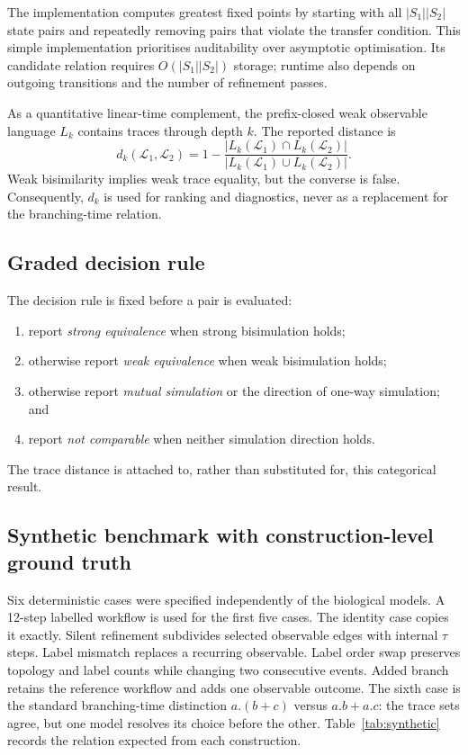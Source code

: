 \documentclass[pdflatex,sn-mathphys-ay]{sn-jnl}
\theoremstyle{definition}
\newcommand{\TAU}{\tau}
\begin{document}
The implementation computes greatest fixed points by starting with all
$|S_1||S_2|$ state pairs and repeatedly removing pairs that violate the transfer
condition. This simple implementation prioritises auditability over asymptotic
optimisation. Its candidate relation requires $O(|S_1||S_2|)$ storage; runtime
also depends on outgoing transitions and the number of refinement passes.

As a quantitative linear-time complement, the prefix-closed weak observable
language $L_k$ contains traces through depth $k$. The reported distance is
\begin{equation}
d_k(\mathcal{L}_1,\mathcal{L}_2)
=1-\frac{|L_k(\mathcal{L}_1)\cap L_k(\mathcal{L}_2)|}
{|L_k(\mathcal{L}_1)\cup L_k(\mathcal{L}_2)|}.
\label{eq:distance}
\end{equation}
Weak bisimilarity implies weak trace equality, but the converse is false.
Consequently, $d_k$ is used for ranking and diagnostics, never as a replacement
for the branching-time relation.

\subsection{Graded decision rule}\label{sec:decision}

The decision rule is fixed before a pair is evaluated:
\begin{enumerate}
\item report \emph{strong equivalence} when strong bisimulation holds;
\item otherwise report \emph{weak equivalence} when weak bisimulation holds;
\item otherwise report \emph{mutual simulation} or the direction of one-way
simulation; and
\item report \emph{not comparable} when neither simulation direction holds.
\end{enumerate}
The trace distance is attached to, rather than substituted for, this categorical
result.

\subsection{Synthetic benchmark with construction-level ground truth}
\label{sec:benchmark-method}

Six deterministic cases were specified independently of the biological models.
A 12-step labelled workflow is used for the first five cases. The identity case
copies it exactly. Silent refinement subdivides selected observable edges with
internal $\TAU$ steps. Label mismatch replaces a recurring observable. Label
order swap preserves topology and label counts while changing two consecutive
events. Added branch retains the reference workflow and adds one observable
outcome. The sixth case is the standard branching-time distinction
$a.(b+c)$ versus $a.b+a.c$: the trace sets agree, but one model resolves its
choice before the other. Table~\ref{tab:synthetic} records the relation expected
from each construction.
\end{document}
